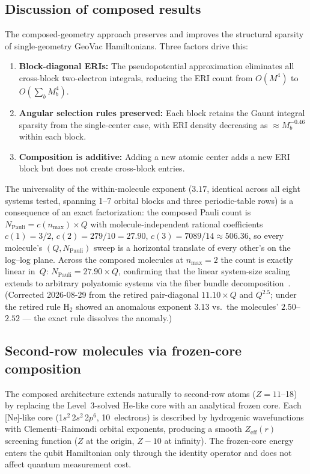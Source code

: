 \documentclass[aps,pra,twocolumn,superscriptaddress,longbibliography]{revtex4-2}
\newcommand{\gvq}[2]{#2}
\begin{document}
\subsection{Discussion of composed results}
\label{sec:composed_discussion}

The composed-geometry approach preserves and improves the structural
sparsity of single-geometry GeoVac Hamiltonians.  Three factors drive
this:
\begin{enumerate}
\item \textbf{Block-diagonal ERIs:} The pseudopotential approximation
  eliminates all cross-block two-electron integrals, reducing the
  ERI count from $O(M^4)$ to $O(\sum_b M_b^4)$.
\item \textbf{Angular selection rules preserved:} Each block retains
  the Gaunt integral sparsity from the single-center case, with ERI
  density decreasing as $\approx M_b^{-0.46}$ within each block.
\item \textbf{Composition is additive:} Adding a new atomic center
  adds a new ERI block but does not create cross-block entries.
\end{enumerate}
The universality of the within-molecule exponent ($3.17$, identical
across all eight systems tested, spanning 1--7 orbital blocks and three
periodic-table rows) is a consequence of an exact factorization: the
composed Pauli count is $N_{\mathrm{Pauli}} = c(n_{\max}) \times Q$
with molecule-independent rational coefficients $c(1) = 3/2$,
$c(2) = 279/10 = 27.90$, $c(3) = 7089/14 \approx 506.36$, so every
molecule's $(Q, N_{\mathrm{Pauli}})$ sweep is a horizontal translate of
every other's on the log--log plane.  Across the composed molecules at
$n_{\max} = 2$ the count is exactly linear in~$Q$:
$N_{\mathrm{Pauli}} = \gvq{composed_coeff}{27.90} \times Q$, confirming that the linear
system-size scaling extends to arbitrary polyatomic systems via the
fiber bundle decomposition~\cite{loutey_paper17}.  (Corrected
2026-08-29 from the retired pair-diagonal $11.10 \times Q$ and
$Q^{2.5}$; under the retired rule H$_2$ showed an anomalous exponent
$3.13$ vs.\ the molecules' $2.50$--$2.52$ --- the exact rule dissolves
the anomaly.)


\subsection{Second-row molecules via frozen-core composition}
\label{sec:second_row}

The composed architecture extends naturally to second-row atoms
($Z = 11$--18) by replacing the Level~3-solved He-like core
with an analytical frozen core.  Each [Ne]-like core
(1$s^2$\,2$s^2$\,2$p^6$, 10~electrons) is described by hydrogenic
wavefunctions with Clementi--Raimondi orbital exponents, producing
a smooth $Z_{\text{eff}}(r)$ screening function ($Z$ at the origin,
$Z-10$ at infinity).  The frozen-core energy enters the qubit
Hamiltonian only through the identity operator and does not affect
quantum measurement cost.
\end{document}
